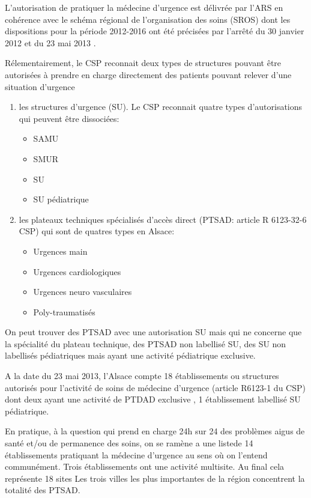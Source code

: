 \documentclass[12pt,english,french,twoside]{report}\usepackage[]{graphicx}\usepackage[]{color}
\begin{document}
L'autorisation de pratiquer la médecine d'urgence est délivrée par l'ARS en cohérence avec le schéma régional de l'organisation des soins (SROS) dont les dispositions pour la période 2012-2016 ont été précisées par l'arrêté du 30 janvier 2012 \cite{14} et du 23 mai 2013 \cite{15}.

Rélementairement, le CSP reconnait deux types de structures pouvant être autorisées à prendre en charge directement des patients pouvant relever d'une situation d'urgence
\begin{enumerate}
  \item les structures d'urgence (SU). Le CSP reconnait quatre types d'autorisations qui peuvent être dissociées:
    \begin{itemize}
      \item SAMU
      \item SMUR
      \item SU
      \item SU pédiatrique
    \end{itemize}

  \item les plateaux techniques spécialisés d'accès direct (PTSAD: article R 6123-32-6 CSP) qui sont de quatres types en Alsace:
    \begin{itemize}
      \item Urgences main
      \item Urgences cardiologiques
      \item Urgences neuro vasculaires
      \item Poly-traumatisés
    \end{itemize}
\end{enumerate}

On peut trouver des PTSAD avec une autorisation SU mais qui ne concerne que la spécialité du plateau technique, des PTSAD non labellisé SU, des SU non labellisés pédiatriques mais ayant une activité pédiatrique exclusive.

A la date du 23 mai 2013, l'Alsace compte 18 établissements ou structures autorisés pour l'activité de soins de médecine d'urgence (article R6123-1 du CSP) dont deux ayant une activité de PTDAD exclusive \cite{15}, 1 établissement labellisé SU pédiatrique.

En pratique, à la question qui prend en charge 24h sur 24 des problèmes aigus de santé et/ou de permanence des soins, on se ramène a une listede 14 établissements pratiquant la médecine d'urgence au sens où on l'entend communément. Trois établissements ont une activité multisite. Au final cela représente 18 sites Les trois villes les plus importantes de la région concentrent la totalité des PTSAD.
\end{document}
